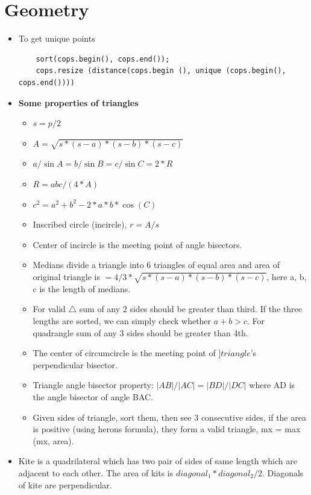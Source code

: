 \documentclass[8pt, a4paper, oneside, twocolumn]{extarticle}
\begin{document}
\section{Geometry}
\begin{itemize}
    \item To get unique points 
    \begin{verbatim}
    sort(cops.begin(), cops.end());
    cops.resize (distance(cops.begin (), unique (cops.begin(), cops.end())))
    \end{verbatim}
    \item \textbf{Some properties of triangles}
    \begin{itemize}
        \item $s = p/2$
        \item $A = \sqrt{s*(s - a)*(s - b)*(s - c)}$
        \item $a/\sin{A} = b/\sin{B} = c/\sin{C} = 2*R$
        \item $R = abc/(4*A)$
        \item $c^2 = a^2 + b^2 - 2*a*b*\cos(C)$
        \item Inscribed circle (incircle), $r = A/s$
        \item Center of incircle is the meeting point of angle bisectors.
        \item Medians divide a triangle into 6 triangles of equal area and area of original triangle is $= 4/3 * \sqrt{s * (s - a) * (s - b) * (s - c)}$, here a, b, c is the length of medians.
        \item For valid $\triangle$ sum of any 2 sides should be greater than third. If the three lengths are sorted, we can simply check whether $a + b > c$. For quadrangle sum of any 3 sides should be greater than 4th.
        \item The center of circumcircle is the meeting point of $]triangle$'s perpendicular bisector.
        \item Triangle angle bisector property: $|AB|/|AC| = |BD|/|DC|$ where AD is the angle bisector of angle BAC. 
        \item Given sides of triangle, sort them, then see 3 consecutive sides, if the area is positive (using herons formula), they form a valid triangle, mx = max (mx, area).
    \end{itemize}
    \item Kite is a quadrilateral which has two pair of sides of same length which are adjacent to each other. The area of kits is $diagonal_1*diagonal_2/2$. Diagonals of kite are perpendicular.

\end{itemize}
\end{document}
